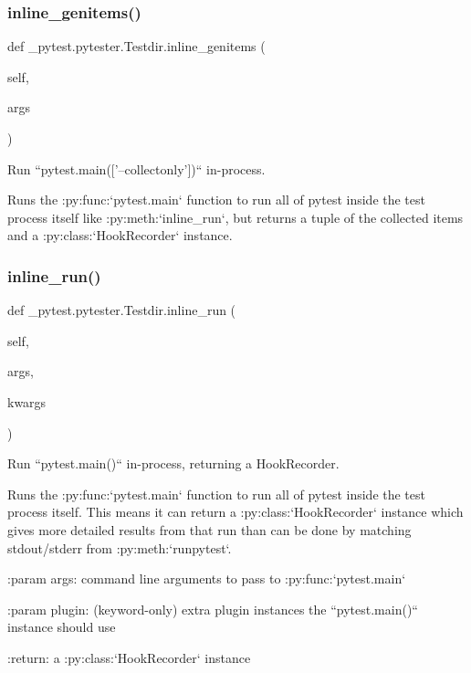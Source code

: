 \subsubsection{\texorpdfstring{inline\+\_\+genitems()}{inline\_genitems()}}
{\footnotesize\ttfamily def \+\_\+pytest.\+pytester.\+Testdir.\+inline\+\_\+genitems (\begin{DoxyParamCaption}\item[{}]{self,  }\item[{}]{args }\end{DoxyParamCaption})}

\begin{DoxyVerb}Run ``pytest.main(['--collectonly'])`` in-process.

Runs the :py:func:`pytest.main` function to run all of pytest inside
the test process itself like :py:meth:`inline_run`, but returns a
tuple of the collected items and a :py:class:`HookRecorder` instance.\end{DoxyVerb}
 \mbox{\label{class__pytest_1_1pytester_1_1_testdir_a4711a4fc9f56c770f3363942196d0795}} 
\subsubsection{\texorpdfstring{inline\+\_\+run()}{inline\_run()}}
{\footnotesize\ttfamily def \+\_\+pytest.\+pytester.\+Testdir.\+inline\+\_\+run (\begin{DoxyParamCaption}\item[{}]{self,  }\item[{}]{args,  }\item[{}]{kwargs }\end{DoxyParamCaption})}

\begin{DoxyVerb}Run ``pytest.main()`` in-process, returning a HookRecorder.

Runs the :py:func:`pytest.main` function to run all of pytest inside
the test process itself.  This means it can return a
:py:class:`HookRecorder` instance which gives more detailed results
from that run than can be done by matching stdout/stderr from
:py:meth:`runpytest`.

:param args: command line arguments to pass to :py:func:`pytest.main`

:param plugin: (keyword-only) extra plugin instances the
   ``pytest.main()`` instance should use

:return: a :py:class:`HookRecorder` instance\end{DoxyVerb}
 \mbox{\label{class__pytest_1_1pytester_1_1_testdir_a2ee5a96d0465218a7690d1b8de82b944}} 
